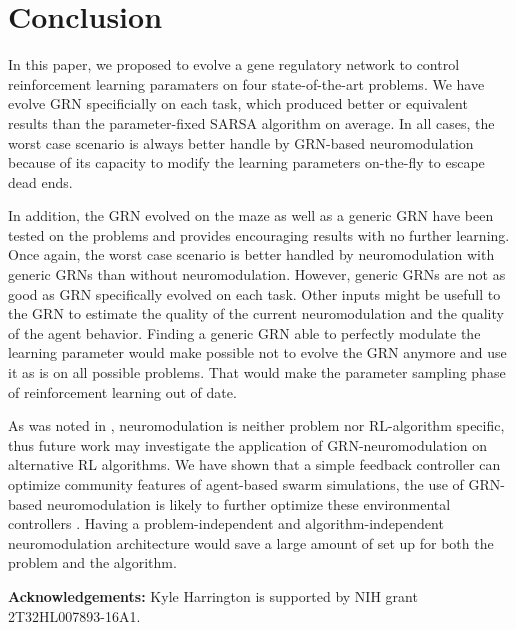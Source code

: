 \section{Conclusion}

In this paper, we proposed to evolve a gene regulatory network to control reinforcement learning paramaters on four state-of-the-art problems. We have evolve GRN specificially on each task, which produced better or equivalent results than the parameter-fixed SARSA algorithm on average. In all cases, the worst case scenario is always better handle by GRN-based neuromodulation because of its capacity to modify the learning parameters on-the-fly to escape dead ends. 

In addition, the GRN evolved on the maze as well as a generic GRN have been tested on the problems and provides encouraging results with no further learning. Once again, the worst case scenario is better handled by neuromodulation with generic GRNs than without neuromodulation. However, generic GRNs are not as good as GRN specifically evolved on each task. Other inputs might be usefull to the GRN to estimate the quality of the current neuromodulation and the quality of the agent behavior. Finding a generic GRN able to perfectly modulate the learning parameter would make possible not to evolve the GRN anymore and use it as is on all possible problems. That would make the parameter sampling phase of reinforcement learning out of date.

As was noted in \cite{Schweighofer2003}, neuromodulation is neither problem nor RL-algorithm specific, thus future work may investigate the application of GRN-neuromodulation on alternative RL algorithms. We have shown that a simple feedback controller can optimize community features of agent-based swarm simulations, the use of GRN-based neuromodulation is likely to further optimize these environmental controllers \cite{Gold2014}. Having a problem-independent and algorithm-independent neuromodulation architecture would save a large amount of set up for both the problem and the algorithm.\newline

\textbf{Acknowledgements:} Kyle Harrington is supported by NIH grant 2T32HL007893-16A1.
